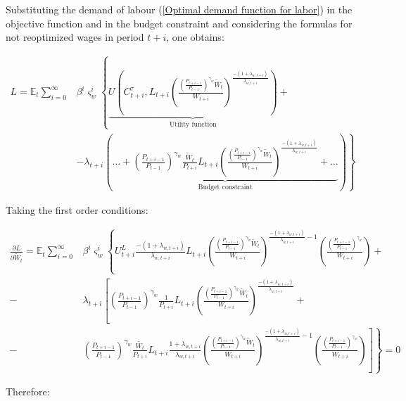 \documentclass{pracamgr}
\numberwithin{equation}{section}
\begin{document}
Substituting the demand of labour (\ref{Optimal demand function for labor}) in the objective function and in the budget constraint and considering the formulas for not reoptimized wages in period $t+i$, one obtains:

\begin{align}
L = \mathbb{E}_{t} \sum\limits_{i=0}^{\infty} &\beta^{i} \varsigma_{w}^{i}  \left\{ \underbrace{U \left(C_{t+i}^{\tau}, L_{t+i} \left( \frac{\left( \frac{P_{t+i-1}}{P_{t-1}} \right)^{\gamma_{w}} \widetilde{W}_{t}}{W_{t+i}}\right)^{\frac{-(1+\lambda_{w,t+i})}{\lambda_{w,t+i}}} \right)}_\text{Utility function} + \right. \nonumber \\
& \left. - \lambda_{t+i} \left( \underbrace{\ldots + \left( \frac{P_{t+i-1}}{P_{t-1}} \right)^{\gamma_{w}} \frac{\widetilde{W}_{t}}{P_{t+i}} L_{t+i} \left( \frac{\left( \frac{P_{t+i-1}}{P_{t-1}} \right)^{\gamma_{w}} \widetilde{W}_{t}}{W_{t+i}}\right)^{\frac{-(1+\lambda_{w,t+i})}{\lambda_{w,t+i}}}
 + \ldots }_\text{Budget constraint} \right) \right\}
\end{align}

Taking the first order conditions:

\begin{align}
\frac{\partial L}{\partial \widetilde{W}_{t}}  =  \mathbb{E}_{t} \sum\limits_{i=0}^{\infty} &\beta^{i} \varsigma_{w}^{i}  \left\{ U_{t+i}^{L} {\frac{-(1+\lambda_{w,t+i})}{\lambda_{w,t+i}}} L_{t+i} \left( \frac{\left( \frac{P_{t+i-1}}{P_{t-1}} \right)^{\gamma_{w}} \widetilde{W}_{t}}{W_{t+i}}\right)^{\frac{-(1+\lambda_{w,t+i})}{\lambda_{w,t+i}}-1} \left( \frac{\left( \frac{P_{t+i-1}}{P_{t-1}} \right)^{\gamma_{w}}}{W_{t+i}}\right)  \right. + \nonumber \\ 
-  &\lambda_{t+i} \left[ \left( \frac{P_{t+i-1}}{P_{t-1}} \right)^{\gamma_{w}} \frac{1}{P_{t+i}} L_{t+i} \left( \frac{\left( \frac{P_{t+i-1}}{P_{t-1}} \right)^{\gamma_{w}} \widetilde{W}_{t}}{W_{t+i}}\right)^{\frac{-(1+\lambda_{w,t+i})}{\lambda_{w,t+i}}} \right. + \nonumber \\ 
-  &\left. \left. \left( \frac{P_{t+i-1}}{P_{t-1}} \right)^{\gamma_{w}} \frac{\widetilde{W_{t}}}{P_{t+i}} L_{t+i} {\frac{1+\lambda_{w,t+i}}{\lambda_{w,t+i}}} \left( \frac{\left( \frac{P_{t+i-1}}{P_{t-1}} \right)^{\gamma_{w}} \widetilde{W}_{t}}{W_{t+i}}\right)^{\frac{-(1+\lambda_{w,t+i})}{\lambda_{w,t+i}}-1} \left( \frac{\left( \frac{P_{t+i-1}}{P_{t-1}} \right)^{\gamma_{w}}}{W_{t+i}}\right) \right] \right\} = 0
\end{align}

Therefore:
\end{document}
